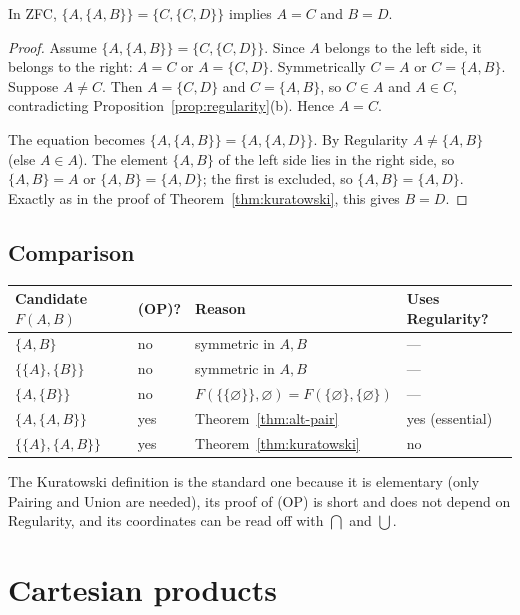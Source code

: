 \begin{theorem}\label{thm:alt-pair}
	In ZFC, $\{A,\{A,B\}\}=\{C,\{C,D\}\}$ implies $A=C$ and $B=D$.
\end{theorem}
\begin{proof}
	Assume $\{A,\{A,B\}\}=\{C,\{C,D\}\}$. Since $A$ belongs to the left side, it belongs to the right: $A=C$ or $A=\{C,D\}$. Symmetrically $C=A$ or $C=\{A,B\}$. Suppose $A\ne C$. Then $A=\{C,D\}$ and $C=\{A,B\}$, so $C\in A$ and $A\in C$, contradicting Proposition~\ref{prop:regularity}(b). Hence $A=C$.
	
	The equation becomes $\{A,\{A,B\}\}=\{A,\{A,D\}\}$. By Regularity $A\ne\{A,B\}$ (else $A\in A$). The element $\{A,B\}$ of the left side lies in the right side, so $\{A,B\}=A$ or $\{A,B\}=\{A,D\}$; the first is excluded, so $\{A,B\}=\{A,D\}$. Exactly as in the proof of Theorem~\ref{thm:kuratowski}, this gives $B=D$.
\end{proof}

\subsection{Comparison}

\begin{center}
	\begin{tabular}{@{}p{3.2cm}p{2.2cm}p{5.6cm}p{2.8cm}@{}}
		\toprule
		\textbf{Candidate $F(A,B)$} & \textbf{(OP)?} & \textbf{Reason} & \textbf{Uses Regularity?}\\
		\midrule
		$\{A,B\}$ & no & symmetric in $A,B$ & ---\\
		$\{\{A\},\{B\}\}$ & no & symmetric in $A,B$ & ---\\
		$\{A,\{B\}\}$ & no & $F(\{\{\varnothing\}\},\varnothing)=F(\{\varnothing\},\{\varnothing\})$ & ---\\
		$\{A,\{A,B\}\}$ & yes & Theorem~\ref{thm:alt-pair} & yes (essential)\\
		$\{\{A\},\{A,B\}\}$ & yes & Theorem~\ref{thm:kuratowski} & no\\
		\bottomrule
	\end{tabular}
\end{center}

The Kuratowski definition is the standard one because it is elementary (only Pairing and Union are needed), its proof of (OP) is short and does not depend on Regularity, and its coordinates can be read off with $\bigcap$ and $\bigcup$.

\section{Cartesian products}


